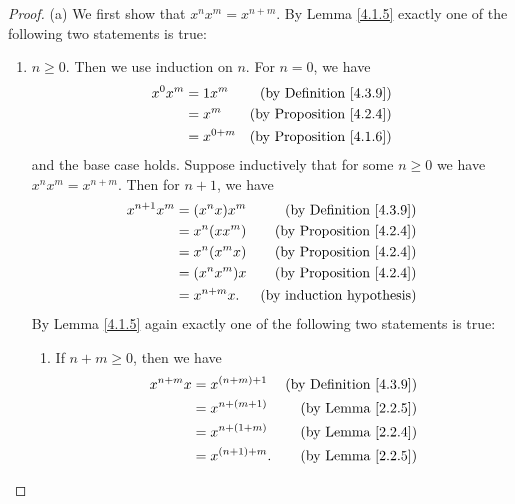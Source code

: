 \begin{proof}{(a)}
    We first show that \(x^n x^m = x^{n + m}\).
    By Lemma \ref{4.1.5} exactly one of the following two statements is true:
    \begin{enumerate}[label=(\Roman*)]
        \item \(n \geq 0\).
              Then we use induction on \(n\).
              For \(n = 0\), we have
              \begin{align*}
                  x^0 x^m & = 1x^m      & \text{(by Definition \ref{4.3.9})}  \\
                          & = x^m       & \text{(by Proposition \ref{4.2.4})} \\
                          & = x^{0 + m} & \text{(by Proposition \ref{4.1.6})}
              \end{align*}
              and the base case holds.
              Suppose inductively that for some \(n \geq 0\) we have \(x^n x^m = x^{n + m}\).
              Then for \(n + 1\), we have
              \begin{align*}
                  x^{n + 1} x^m & = (x^n x) x^m  & \text{(by Definition \ref{4.3.9})}  \\
                                & = x^n (x x^m)  & \text{(by Proposition \ref{4.2.4})} \\
                                & = x^n (x^m x)  & \text{(by Proposition \ref{4.2.4})} \\
                                & = (x^n x^m) x  & \text{(by Proposition \ref{4.2.4})} \\
                                & = x^{n + m} x. & \text{(by induction hypothesis)}
              \end{align*}
              By Lemma \ref{4.1.5} again exactly one of the following two statements is true:
              \begin{enumerate}[label=(\roman*)]
                  \item If \(n + m \geq 0\), then we have
                        \begin{align*}
                            x^{n + m} x & = x^{(n + m) + 1}  & \text{(by Definition \ref{4.3.9})} \\
                                        & = x^{n + (m + 1)}  & \text{(by Lemma \ref{2.2.5})}      \\
                                        & = x^{n + (1 + m)}  & \text{(by Lemma \ref{2.2.4})}      \\
                                        & = x^{(n + 1) + m}. & \text{(by Lemma \ref{2.2.5})}

\end{align*}
\end{enumerate}
\end{enumerate}
\end{proof}
